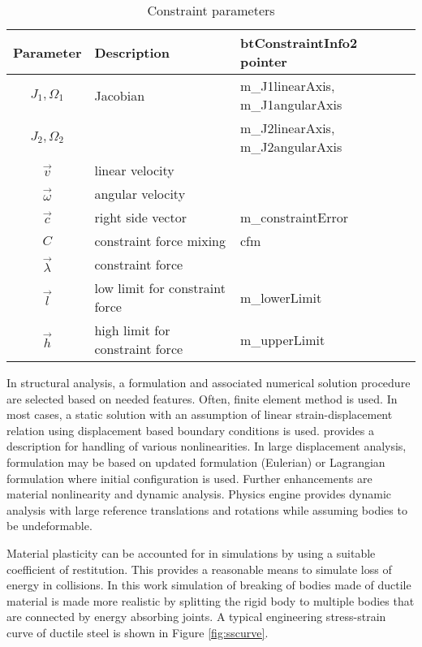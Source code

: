 \begin {table}
\caption {Constraint parameters}
\label{tab:constraintParameters} 
\begin{center}
\begin{tabular}{|c| l| l|}
\hline
{\bf Parameter} & {\bf Description} & {\bf btConstraintInfo2 pointer}\\  \hline
$J_1, \Omega_1$ & Jacobian & m\_J1linearAxis, m\_J1angularAxis \\
$J_2, \Omega_2$ & & m\_J2linearAxis, m\_J2angularAxis \\ \hline
$\vec{v}$ & linear velocity & \\ \hline
$\vec{\omega}$ & angular velocity & \\ \hline
$\vec{c}$        &  right side vector   & m\_constraintError \\ \hline
$C$  & constraint force mixing & cfm \\  \hline
$\vec{\lambda}$ & constraint force &  \\ \hline
$\vec{l}$ & low limit for constraint force & m\_lowerLimit \\ \hline
$\vec{h}$ & high limit for constraint force & m\_upperLimit \\ \hline
\end {tabular}
\end{center}
\end {table}


In structural analysis, a formulation and associated numerical solution procedure are selected 
based on needed features.
Often,  finite element method is used.
In most cases, a static solution with an assumption of linear strain-displacement relation
using displacement based boundary conditions is used.
\cite{bathe-1975} provides a description for handling of various nonlinearities.
In large displacement analysis, formulation may be based on updated formulation (Eulerian) or
Lagrangian formulation where initial configuration is used.
Further enhancements are material nonlinearity and dynamic analysis.
Physics engine provides dynamic analysis with large reference translations and rotations
while assuming bodies to be undeformable.

Material plasticity can be accounted for in simulations by using a suitable coefficient of restitution.
This provides a reasonable means to simulate loss of energy in collisions.
In this work simulation of breaking of bodies made of ductile material is made more realistic 
by splitting the rigid body
to multiple bodies that are connected by energy absorbing joints.
A typical engineering stress-strain curve of ductile steel is shown in Figure \ref{fig:sscurve}.

